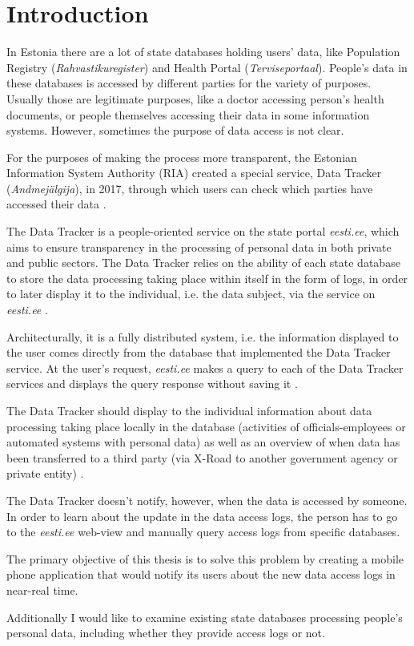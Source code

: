 \section{Introduction} \label{Introduction}

In Estonia there are a lot of state databases holding users' data, like Population Registry (\textit{Rahvastikuregister}) and Health Portal (\textit{Terviseportaal}). People's data in these databases is accessed by different parties for the variety of purposes. Usually those are legitimate purposes, like a doctor accessing person's health documents, or people themselves accessing their data in some information systems. However, sometimes the purpose of data access is not clear.

For the purposes of making the process more transparent, the Estonian Information System Authority (RIA) created a special service, Data Tracker (\textit{Andmejälgija}), in 2017, through which users can check which parties have accessed their data \cite{err-population-registry-unauthorized-access}. 

The Data Tracker is a people-oriented service on the state portal \textit{eesti.ee}, which aims to ensure transparency in the processing of personal data in both private and public sectors. The Data Tracker relies on the ability of each state database to store the data processing taking place within itself in the form of logs, in order to later display it to the individual, i.e. the data subject, via the service on \textit{eesti.ee} \cite{aj-github}.

Architecturally, it is a fully distributed system, i.e. the information displayed to the user comes directly from the database that implemented the Data Tracker service. At the user's request, \textit{eesti.ee} makes a query to each of the Data Tracker services and displays the query response without saving it \cite{aj-github}.

The Data Tracker should display to the individual information about data processing taking place locally in the database (activities of officials-employees or automated systems with personal data) as well as an overview of when data has been transferred to a third party (via X-Road to another government agency or private entity) \cite{aj-github}.

The Data Tracker doesn't notify, however, when the data is accessed by someone. In order to learn about the update in the data access logs, the person has to go to the \textit{eesti.ee} web-view and manually query access logs from specific databases. 

The primary objective of this thesis is to solve this problem by creating a mobile phone application that would notify its users about the new data access logs in near-real time. 

Additionally I would like to examine existing state databases processing people's personal data, including whether they provide access logs or not.